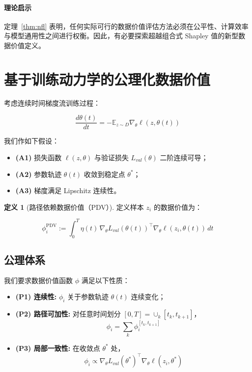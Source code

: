 \documentclass[12pt,a4paper]{ctexart}
\theoremstyle{definition}
\newtheorem{definition}{定义}[section]
\theoremstyle{plain}
\begin{document}
\paragraph{理论启示}
定理~\ref{thm:nfl} 表明，任何实际可行的数据价值评估方法必须在公平性、计算效率与模型通用性之间进行权衡。因此，有必要探索超越组合式 Shapley 值的新型数据价值定义。

\section{基于训练动力学的公理化数据价值}
\label{sec:pdv}

考虑连续时间梯度流训练过程：

\begin{equation}
\frac{d\theta(t)}{dt} = - \mathbb{E}_{z \sim D} \nabla_\theta \ell(z, \theta(t))
\end{equation}

我们作如下假设：

\begin{itemize}
    \item \textbf{(A1)} 损失函数 $\ell(z, \theta)$ 与验证损失 $L_{val}(\theta)$ 二阶连续可导；
    
    \item \textbf{(A2)} 参数轨迹 $\theta(t)$ 收敛到稳定点 $\theta^*$；
    
    \item \textbf{(A3)} 梯度满足 Lipschitz 连续性。
\end{itemize}

\begin{definition}[路径依赖数据价值（PDV）]
\label{def:pdv}
定义样本 $z_i$ 的数据价值为：

\begin{equation}
\phi_i^{\mathrm{PDV}} :=
\int_0^T 
\eta(t)\,
\nabla_\theta L_{val}(\theta(t))^\top 
\nabla_\theta \ell(z_i, \theta(t)) \, dt
\end{equation}
\end{definition}

\subsection{公理体系}

我们要求数据价值函数 $\phi$ 满足以下性质：

\begin{itemize}
    \item \textbf{(P1) 连续性:} $\phi_i$ 关于参数轨迹 $\theta(t)$ 连续变化；
    
    \item \textbf{(P2) 路径可加性:} 对任意时间划分 $[0,T] = \cup_k [t_k, t_{k+1}]$，
    \[
    \phi_i = \sum_k \phi_i^{[t_k, t_{k+1}]}
    \]
    
    \item \textbf{(P3) 局部一致性:} 在收敛点 $\theta^*$ 处，
    \[
    \phi_i \propto 
    \nabla_\theta L_{val}(\theta^*)^\top 
    \nabla_\theta \ell(z_i, \theta^*)
    \]
\end{itemize}
\end{document}
